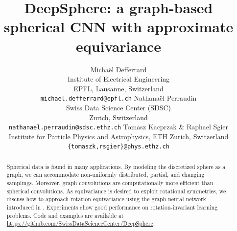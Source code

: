 \documentclass{article} %
\title{DeepSphere: a graph-based spherical CNN with approximate equivariance}
\author{Michaël Defferrard \\
Institute of Electrical Engineering \\
EPFL, Lausanne, Switzerland \\
\texttt{michael.defferrard@epfl.ch}
\And
Nathanaël Perraudin \\
Swiss Data Science Center (SDSC) \\
Zurich, Switzerland \\
\texttt{nathanael.perraudin@sdsc.ethz.ch}
\And
Tomasz Kacprzak \& Raphael Sgier \\
Institute for Particle Physics and Astrophysics, ETH Zurich, Switzerland \\
\texttt{\{tomaszk,rsgier\}@phys.ethz.ch} \\
}
\newcommand{\1}{\b{1}}              %
\newcommand{\0}{\b{0}}              %
\begin{document}
\maketitle

\begin{abstract}
	Spherical data is found in many applications.
	By modeling the discretized sphere as a graph, we can accommodate non-uniformly distributed, partial, and changing samplings.
	Moreover, graph convolutions are computationally more efficient than spherical convolutions.
	As equivariance is desired to exploit rotational symmetries, we discuss how to approach rotation equivariance using the graph neural network introduced in \citet{defferrard2016convolutional}.
	Experiments show good performance on rotation-invariant learning problems.
	Code and examples are available at \url{https://github.com/SwissDataScienceCenter/DeepSphere}.
\end{abstract}
\end{document}
